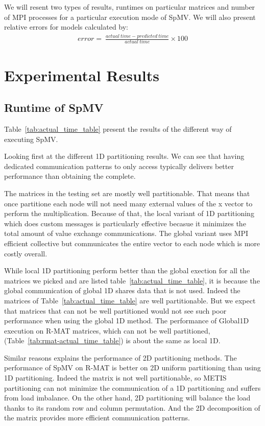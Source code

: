 \documentclass[sigconf,review,anonymous]{acmart}
\begin{document}
We will resent two types of results, runtimes on particular matrices
and number of MPI processes for a particular execution mode of
SpMV. We will also present relative errors for models calculated by:
\begin{eqnarray*}
error =\ \frac{actual\ time - predicted\ time}{actual\ time}\times 100
\end{eqnarray*}


\section{Experimental Results}

\subsection{Runtime of SpMV}

Table~\ref{tab:actual_time_table} present the results of the different way of executing SpMV.

Looking first at the different 1D partitioning results. We can see
that having dedicated communication patterns to only access typically
delivers better performance than obtaining the complete.

The matrices in the testing set are mostly well partitionable. That
means that once partitione each node will not need many external
values of the x vector to perform the multiplication. Because of that,
the local variant of 1D partitioning which does custom messages is
particularly effective becasue it minimizes the total amount of value
exchange communications. The global variant uses MPI efficient
collective but communicates the entire vector to each node which is
more costly overall.

While local 1D partitioning perform better than the global exection
for all the matrices we picked and are listed
table~\ref{tab:actual_time_table}, it is because the global
communication of global 1D shares data that is not used. Indeed the
matrices of Table~\ref{tab:actual_time_table} are well
partitionable. But we expect that matrices that can not be well
partitioned would not see such poor performance when using the global
1D method. The performance of Global1D execution on R-MAT matrices,
which can not be well partitioned,
(Table~\ref{tab:rmat-actual_time_table}) is about the same as local
1D.

Similar reasons explains the performance of 2D partitioning methods.
The performance of SpMV on R-MAT is better on 2D uniform partitioning
than using 1D partitioning. Indeed the matrix is not well
partitionable, so METIS partitioning can not minimize the
communication of a 1D partitioning and suffers from load imbalance. On
the other hand, 2D partitioning will balance the load thanks to its
random row and column permutation. And the 2D decomposition of the
matrix provides more efficient communication patterns.
\end{document}
